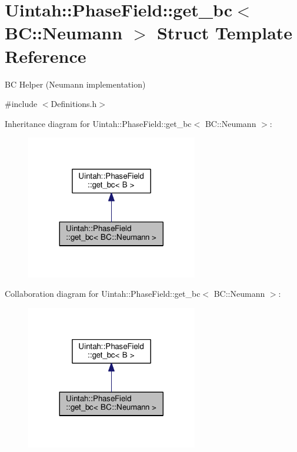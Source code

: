 \hypertarget{structUintah_1_1PhaseField_1_1get__bc_3_01BC_1_1Neumann_01_4}{}\section{Uintah\+:\+:Phase\+Field\+:\+:get\+\_\+bc$<$ BC\+:\+:Neumann $>$ Struct Template Reference}
\label{structUintah_1_1PhaseField_1_1get__bc_3_01BC_1_1Neumann_01_4}


BC Helper (Neumann implementation)  




{\ttfamily \#include $<$Definitions.\+h$>$}



Inheritance diagram for Uintah\+:\+:Phase\+Field\+:\+:get\+\_\+bc$<$ BC\+:\+:Neumann $>$\+:\nopagebreak
\begin{figure}[H]
\begin{center}
\leavevmode
\includegraphics[width=212pt]{structUintah_1_1PhaseField_1_1get__bc_3_01BC_1_1Neumann_01_4__inherit__graph}
\end{center}
\end{figure}


Collaboration diagram for Uintah\+:\+:Phase\+Field\+:\+:get\+\_\+bc$<$ BC\+:\+:Neumann $>$\+:\nopagebreak
\begin{figure}[H]
\begin{center}
\leavevmode
\includegraphics[width=212pt]{structUintah_1_1PhaseField_1_1get__bc_3_01BC_1_1Neumann_01_4__coll__graph}
\end{center}
\end{figure}
